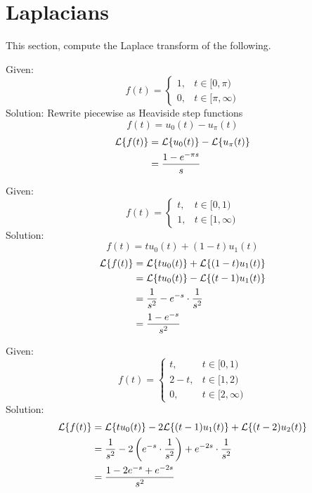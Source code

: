 \documentclass[diffeq.tex]{subfiles}
\begin{document}
\section{Laplacians}
This section, compute the Laplace transform of the following.
\begin{homework*}[247.16]
    Given:
    \begin{equation}
        f(t) = \begin{cases}
            1, &t\in[0, \pi)\\
            0, &t\in[\pi, \infty)
        \end{cases}
    \end{equation}
    Solution:
    Rewrite piecewise as Heaviside step functions
    \begin{equation}
        f(t) = u_{0}(t) - u_{\pi}(t)
    \end{equation}
    \begin{alignat}{1}
        \mathcal{L}\{f(t)\} &= \mathcal{L}\{u_{0}(t)\} - \mathcal{L}\{u_{\pi}(t)\}\\
        &= \frac{1 - e^{-\pi s}}{s}
    \end{alignat}
\end{homework*}
\np
\begin{homework*}[247.17]
    Given:
    \begin{equation}
        f(t) = \begin{cases}
            t, &t\in[0, 1)\\
            1, &t\in[1, \infty)
        \end{cases}
    \end{equation}
    Solution:
    \begin{equation}
        f(t) = tu_{0}(t) + (1 - t)u_{1}(t)
    \end{equation}
    \begin{alignat}{1}
        \mathcal{L}\{f(t)\} &= \mathcal{L}\{tu_{0}(t)\} + \mathcal{L}\{(1 - t)u_{1}(t)\}\\
        &= \mathcal{L}\{tu_{0}(t)\} - \mathcal{L}\{(t - 1)u_{1}(t)\}\\
        &= \frac{1}{s^{2}} - e^{-s}\cdot\frac{1}{s^{2}}\\
        &= \frac{1-e^{-s}}{s^{2}}
    \end{alignat}
\end{homework*}
\begin{homework*}[247.18]
    Given:
    \begin{equation}
        f(t) = \begin{cases}
            t, &t\in[0,1)\\
            2-t, &t\in[1,2)\\
            0, &t\in[2,\infty)
        \end{cases}
    \end{equation}
    Solution:
    \begin{alignat}{1}
        \mathcal{L}\{f(t)\} &= \mathcal{L}\{tu_{0}(t)\} - 2\mathcal{L}\{(t - 1)u_{1}(t)\} + \mathcal{L}\{(t-2)u_{2}(t)\}\\
        &= \frac{1}{s^{2}} - 2\left(e^{-s}\cdot\frac{1}{s^{2}}\right) + e^{-2s}\cdot\frac{1}{s^{2}}\\
        &= \frac{1 - 2e^{-s} + e^{-2s}}{s^{2}}
    \end{alignat}
\end{homework*}
\np
\end{document}
